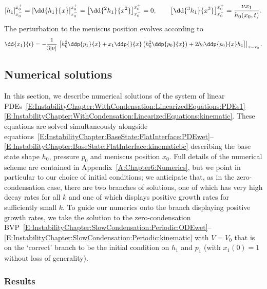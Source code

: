 \begin{equation}\label{E:InstabilityChapter:WithCondensation:LinearizedEquations:JumpConditions}
\left[h_1\right]_{x_0^-}^{x_0^+} =  \left[\dd{h_1}{\x}\right]_{x_0^-}^{x_0^+} =   \left[\dd{^2h_1}{\x^2}\right]_{x_0^-}^{x_0^+} =  0, \qquad   \left[\dd{^3h_1}{\x^3}\right]_{x_0^-}^{x_0^+}  = \frac{\nu x_1}{h_0(x_0,t)}.
\end{equation}
The perturbation to the meniscus position evolves according to
\begin{equation}\label{E:InstabilityChapter:WithCondensation:LinearizedEquations:kinematic}
\dd{x_1}{t} =-\frac{1}{3|\nu|}\left.\left[ h_0^2 \ddp{p_1}{x} + x_1 \ddp{}{x}\left(h_0^2 \ddp{p_0}{x} \right) + 2 h_0 \ddp{p_0}{x} h_1 \right]\right|_{x = x_0}.
\end{equation}


\subsection{Numerical solutions}
In this section, we describe numerical solutions of the system of linear PDEs~\eqref{E:InstabilityChapter:WithCondensation:LinearizedEquations:PDEs1}--\eqref{E:InstabilityChapter:WithCondensation:LinearizedEquations:kinematic}. These equations are solved simultaneously alongside equations~\eqref{E:InstabilityChapter:BaseState:FlatInterface:PDEwet}--\eqref{E:InstabilityChapter:BaseState:FlatInterface:kinematicbc} describing the base state shape $h_0$, pressure $p_0$ and meniscus position $x_0$. Full details of the numerical scheme are contained in Appendix~\ref{A:Chapter6:Numerics}, but we point in particular to our choice of initial conditions; we anticipate that, as in the zero-condensation case, there are two branches of solutions, one of which has very high decay rates for all $k$ and one of which displays positive growth rates for sufficiently small $k$. To guide our numerics onto the branch displaying positive growth rates, we take the solution to the zero-condensation BVP~\eqref{E:InstabilityChapter:SlowCondensation:Periodic:ODEwet}--\eqref{E:InstabilityChapter:SlowCondensation:Periodic:kinematic} with $V = V_0$ that is on the `correct' branch to be the initial condition on $h_1$ and $p_1$ (with $x_1(0) = 1$ without loss of generality).

\subsubsection{Results}

